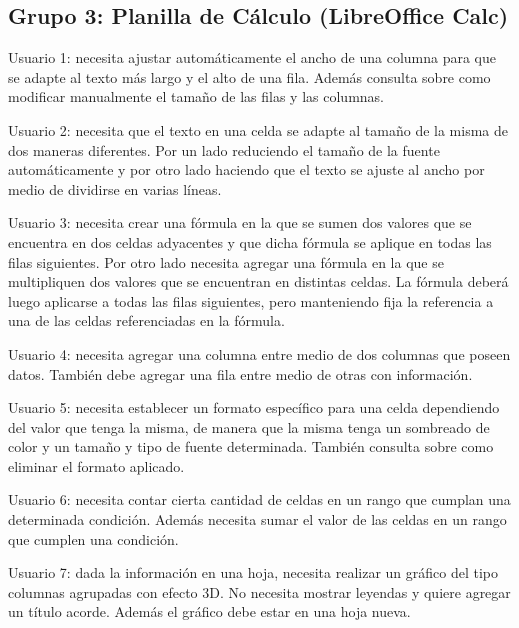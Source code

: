 \documentclass[12pt]{article}
\begin{document}
\subsection*{Grupo 3: Planilla de Cálculo (LibreOffice Calc)}

\begin{description}

    \item{Usuario 1}: necesita ajustar automáticamente el ancho de una columna
    para que se adapte al texto más largo y el alto de una fila. Además
    consulta sobre como modificar manualmente el tamaño de las filas y las
    columnas.

    \item{Usuario 2}: necesita que el texto en una celda se adapte al tamaño
    de la misma de dos maneras diferentes. Por un lado reduciendo el tamaño de
    la fuente automáticamente y por otro lado haciendo que el texto se ajuste
    al ancho por medio de dividirse en varias líneas.

    \item{Usuario 3}: necesita crear una fórmula en la que se sumen dos
    valores que se encuentra en dos celdas adyacentes y que dicha fórmula se
    aplique en todas las filas siguientes. Por otro lado necesita agregar una
    fórmula en la que se multipliquen dos valores que se encuentran en
    distintas celdas. La fórmula deberá luego aplicarse a todas las filas
    siguientes, pero manteniendo fija la referencia a una de las celdas
    referenciadas en la fórmula.

    \item{Usuario 4}: necesita agregar una columna entre medio de dos columnas
    que poseen datos.  También debe agregar una fila entre medio de otras con
    información.

    \item{Usuario 5}: necesita establecer un formato específico para una celda
    dependiendo del valor que tenga la misma, de manera que la misma tenga un
    sombreado de color y un tamaño y tipo de fuente determinada. También
    consulta sobre como eliminar el formato aplicado.

    \item{Usuario 6}: necesita contar cierta cantidad de celdas en un rango
    que cumplan una determinada condición. Además necesita sumar el valor de
    las celdas en un rango que cumplen una condición.

    \item{Usuario 7}: dada la información en una hoja, necesita realizar un
    gráfico del tipo columnas agrupadas con efecto 3D. No necesita mostrar
    leyendas y quiere agregar un título acorde. Además el gráfico debe estar
    en una hoja nueva.


\end{description}
\end{document}

